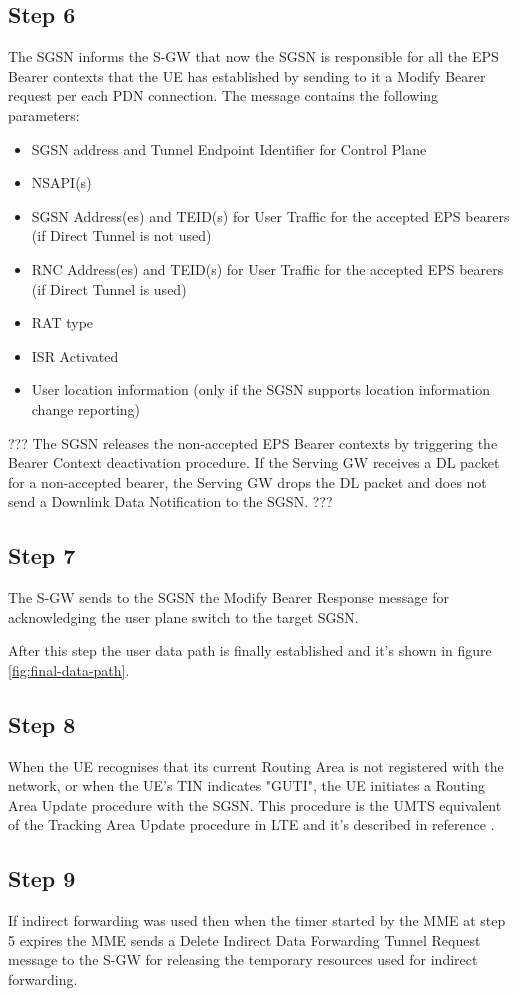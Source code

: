\subsection*{Step 6}
The SGSN informs the S-GW that now the SGSN is responsible for all the EPS Bearer
contexts that the UE has established by sending to it a Modify Bearer request per
each PDN connection. The message contains the following parameters:
\begin{itemize}
	\item SGSN address and Tunnel Endpoint Identifier for Control Plane
	\item NSAPI(s)
	\item SGSN Address(es) and TEID(s) for User Traffic for the accepted EPS bearers
	(if Direct Tunnel is not used)
	\item RNC Address(es) and TEID(s) for User Traffic for the accepted EPS bearers
	(if Direct Tunnel is used)
	\item RAT type
	\item ISR Activated
	\item User location information (only if the SGSN supports location information
	change reporting)
\end{itemize}
??? The SGSN releases the non-accepted EPS Bearer contexts by triggering the Bearer Context deactivation
procedure. If the Serving GW receives a DL packet for a non-accepted bearer, the Serving GW drops the DL
packet and does not send a Downlink Data Notification to the SGSN. ???




\subsection*{Step 7}
The S-GW sends to the SGSN the Modify Bearer Response message for acknowledging
the user plane switch to the target SGSN.

After this step the user data path is finally established and it's shown in
figure \ref{fig:final-data-path}.




\subsection*{Step 8}
When the UE recognises that its current Routing Area is not registered with the
network, or when the UE's TIN indicates "GUTI", the UE initiates a Routing Area
Update procedure with the SGSN. This procedure is the UMTS equivalent of the
Tracking Area Update procedure in LTE and it's described in reference
\cite{routing-area-update}.




\subsection*{Step 9}
If indirect forwarding was used then when the timer started by the MME at step 5
expires the MME sends a Delete Indirect Data Forwarding Tunnel Request message
to the S-GW for releasing the temporary resources used for indirect forwarding.

